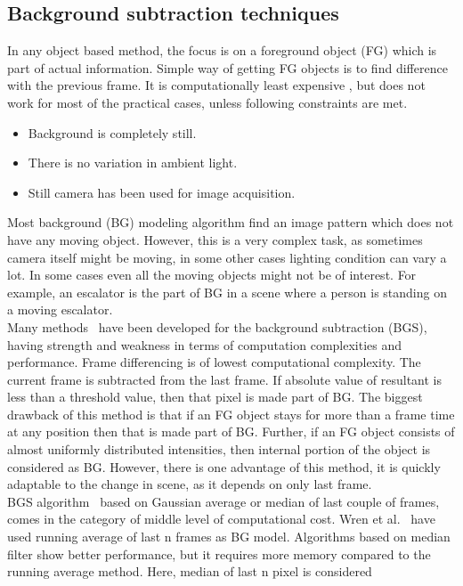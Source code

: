 \subsection{Background subtraction techniques}
\label{bg_subs_technique}
\indent In any object based method, the focus is on a foreground object
(FG) which is part of actual information. Simple way of getting FG
objects is to find difference with the previous frame. It is
computationally least expensive , but does not work for most of the
practical cases, unless following constraints are met.
\begin{itemize}
	\item Background is completely still.
	\item There is no variation in ambient light.
	\item Still camera has been used for image acquisition.
\end{itemize}
\indent Most background (BG) modeling algorithm find an image pattern
which does not have any moving object. However, this is a very complex
task, as sometimes camera itself might be moving, in some other cases
lighting condition can vary a lot. In some cases even all the moving
objects might not be of interest. For example, an escalator is the part
of BG in a scene where a person is standing on a moving escalator.\\
\indent Many methods~\cite{9, 10, 11, 12, 13, 14} have been developed
for the background subtraction (BGS), having strength and weakness in
terms of computation complexities and performance. Frame differencing is
of lowest computational complexity. The current frame is subtracted from
the last frame. If absolute value of resultant is less than a threshold
value, then that pixel is made part of BG.  The biggest drawback of this
method is that if an FG object stays for more than a frame time at any
position then that is made part of BG. Further, if an FG object consists
of almost uniformly distributed intensities, then internal portion of
the object is considered as BG. However, there is one advantage of this
method, it is quickly adaptable to the change in scene, as it depends on
only last frame.\\
\indent BGS algorithm~\cite{10, 12, 13, 14, 15} based on Gaussian
average or median of last couple of frames, comes in the category of
middle level of computational cost. Wren et al.~\cite{12} have used
running average of last n frames as BG model. Algorithms based on median
filter show better performance, but it requires more memory compared to
the running average method. Here, median of last n pixel is considered
